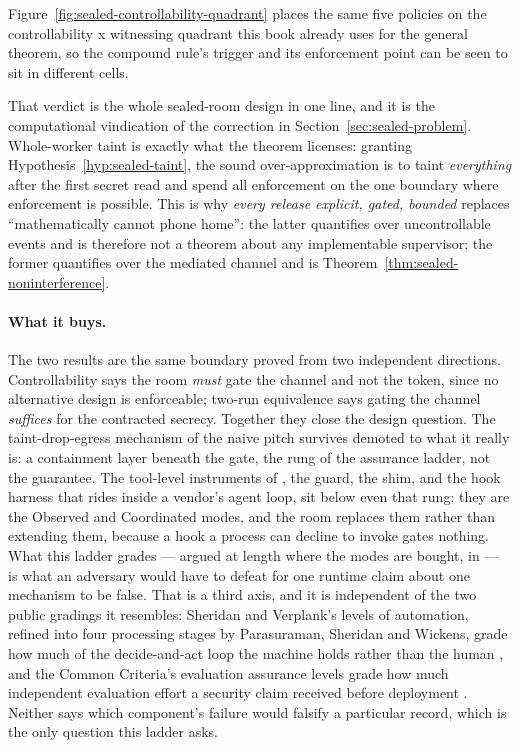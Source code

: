 \documentclass[11pt,a4paper]{article}
\theoremstyle{definition}
\begin{document}
Figure~\ref{fig:sealed-controllability-quadrant} places the same five
policies on the controllability x witnessing quadrant this book already
uses for the general theorem, so the compound rule's trigger and its
enforcement point can be seen to sit in different cells.



That verdict is the whole sealed-room design in one line, and it is the
computational vindication of the correction in
Section~\ref{sec:sealed-problem}. Whole-worker taint is exactly what the
theorem licenses: granting Hypothesis~\ref{hyp:sealed-taint}, the sound
over-approximation is to taint \emph{everything} after the first secret read
and spend all enforcement on the one boundary where enforcement is possible.
This is why \emph{every release explicit, gated, bounded} replaces
``mathematically cannot phone home'': the latter quantifies over uncontrollable
events and is therefore not a theorem about any implementable supervisor; the
former quantifies over the mediated channel and is
Theorem~\ref{thm:sealed-noninterference}.

\paragraph{What it buys.}
The two results are the same boundary proved from two independent directions.
Controllability says the room \emph{must} gate the channel and not the token,
since no alternative design is enforceable; two-run equivalence says gating the
channel \emph{suffices} for the contracted secrecy. Together they close the
design question. The taint-drop-egress mechanism of the naive pitch survives
demoted to what it really is: a containment layer beneath the gate, the
 rung of the assurance ladder, not the guarantee. The
tool-level instruments of , the
guard, the shim, and the hook harness that rides inside a vendor's agent
loop, sit below even that rung: they are the Observed and Coordinated modes,
and the room replaces them rather than extending them, because a hook a
process can decline to invoke gates nothing. What this ladder grades ---
argued at length where the modes are bought, in
 --- is what an adversary would have
to defeat for one runtime claim about one mechanism to be false. That is a
third axis, and it is independent of the two public gradings it resembles:
Sheridan and Verplank's levels of automation, refined into four processing
stages by Parasuraman, Sheridan and Wickens, grade how much of the
decide-and-act loop the machine holds rather than the human
, and the Common Criteria's
evaluation assurance levels grade how much independent evaluation effort a
security claim received before deployment . Neither says
which component's failure would falsify a particular record, which is the only
question this ladder asks.
\end{document}
